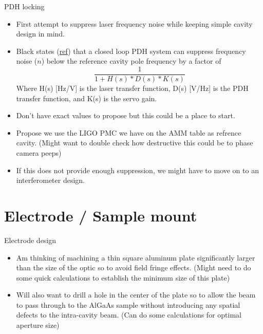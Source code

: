 \documentclass{beamer}
\begin{document}
\begin{frame}{PDH locking}

\begin{itemize}
\item First attempt to suppress laser frequency noise while keeping simple cavity design in mind. 
\item Black states (\href{https://youtu.be/tX884B8GrEE}{ref}) that a closed loop PDH system can suppress frequency noise ($n$) below the reference cavity pole frequency by a factor of $$\frac{1}{1 + H(s)*D(s)*K(s)}$$
Where H(s) [Hz/V] is the laser transfer function, D(s) [V/Hz] is the PDH transfer function, and K(s) is the servo gain. 
\item Don’t have exact values to propose but this could be a place to start. 
\item Propose we use the LIGO PMC we have on the AMM table as refrence cavity. (Might want to double check how destructive this could be to phase camera peeps)
\item If this does not provide enough suppression, we might have to move on to an interferometer design. 

\end{itemize}
\end{frame}

\section{Electrode / Sample mount}
\begin{frame}{Electrode design}
\begin{itemize}
\item Am thinking of machining a thin square aluminum plate significantly larger than the size of the optic so to avoid field fringe effects. (Might need to do some quick calculations to establish the minimum size of this plate)
\item Will also want to drill a hole in the center of the plate so to allow the beam to pass through to the AlGaAs sample without introducing any spatial defects to the intra-cavity beam. (Can do some calculations for optimal aperture size)
\end{itemize}
\end{frame}
\end{document}
